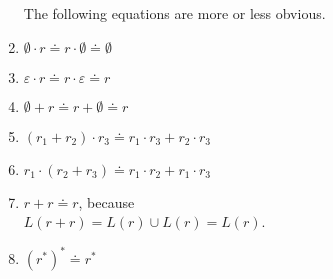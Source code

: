 \begin{enumerate}
      The following equations are more or less obvious.
\item $\emptyset \cdot r \doteq r \cdot \emptyset \doteq \emptyset$
\item $\varepsilon \cdot r \doteq r \cdot \varepsilon \doteq r$
\item $\emptyset + r \doteq r + \emptyset \doteq r$
\item $(r_1 + r_2) \cdot r_3 \doteq r_1 \cdot r_3 + r_2 \cdot r_3$
\item $r_1 \cdot (r_2 + r_3) \doteq r_1 \cdot r_2 + r_1 \cdot r_3$
\item $r + r \doteq r$, because
      \\[0.2cm]
      \hspace*{1.3cm}
      $L(r+r) = L(r) \cup L(r) = L(r)$.
\item $(r^*)^* \doteq r^*$      


\end{enumerate}
